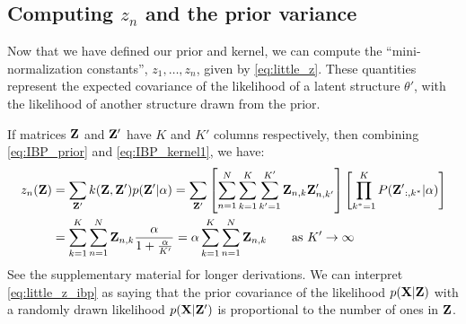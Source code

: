 \subsection{Computing $z_n$ and the prior variance}

Now that we have defined our prior and kernel, we can compute the ``mini-normalization constants'', $z_1, \dots, z_n$, given by \eqref{eq:little_z}.  These quantities represent the expected covariance of the likelihood of a latent structure $\theta'$, with the likelihood of another structure drawn from the prior.

If matrices $\mathbf{Z}$ and $\mathbf{Z}'$ have $K$ and $K'$ columns respectively, then combining \eqref{eq:IBP_prior} and \eqref{eq:IBP_kernel1}, we have:
%
\begin{align}
z_n( \mathbf{Z} ) & = \sum_{\mathbf{Z}'} k(\mathbf{Z}, \mathbf{Z}') p(\mathbf{Z}' | \alpha)
  = \sum_{\mathbf{Z}'} \left[ \sum_{n=1}^N \sum_{k=1}^{K} \sum_{k'=1}^{K'} \mathbf{Z}_{n,k} \mathbf{Z}'_{n,k'} \right] \left[ \prod_{{k}^*=1}^K P({\mathbf{Z}'}_{:,k^*} | \alpha ) \right] \\
& = \sum_{k=1}^{K} \sum_{n=1}^N \mathbf{Z}_{n,k} \frac{\alpha}{1 + \frac{\alpha}{K'}} 
 = \alpha  \sum_{k=1}^{K} \sum_{n=1}^N \mathbf{Z}_{n,k} \qquad \textrm{as $K' \rightarrow \infty$}
\label{eq:little_z_ibp}
\end{align}
%
See the supplementary material for longer derivations.
%
We can interpret \eqref{eq:little_z_ibp} as saying that the prior covariance of the likelihood $p(\mathbf{X}|\mathbf{Z})$ with a randomly drawn likelihood $p(\mathbf{X}|\mathbf{Z}')$ is proportional to the number of ones in $\mathbf{Z}$.  %

